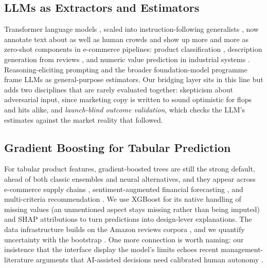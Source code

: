 \documentclass[journal]{IEEEtran}
\begin{document}
\subsection{LLMs as Extractors and Estimators}
Transformer language models \cite{vaswani2017attention,devlin2019bert}, scaled into instruction-following generalists \cite{brown2020gpt3,ouyang2022instruct,openai2023gpt4,gemini2023,touvron2023llama}, now annotate text about as well as human crowds \cite{gilardi2023chatgpt} and show up more and more as zero-shot components in e-commerce pipelines: product classification \cite{roumeliotis2025llms}, description generation from reviews \cite{gutierrez2025zeroshot}, and numeric value prediction in industrial systems \cite{hidayat2025custody}. Reasoning-eliciting prompting \cite{wei2022chain} and the broader foundation-model programme \cite{bommasani2021foundation} frame LLMs as general-purpose estimators. Our bridging layer sits in this line but adds two disciplines that are rarely evaluated together: skepticism about adversarial input, since marketing copy is written to sound optimistic for flops and hits alike, and \emph{launch-blind outcome validation}, which checks the LLM's estimates against the market reality that followed.

\subsection{Gradient Boosting for Tabular Prediction}
For tabular product features, gradient-boosted trees \cite{friedman2001greedy,chen2016xgboost,ke2017lightgbm} are still the strong default, ahead of both classic ensembles \cite{breiman2001random} and neural alternatives, and they appear across e-commerce supply chains \cite{sayyad2024catboost}, sentiment-augmented financial forecasting \cite{zhen2025stock,shang2025bitcoin}, and multi-criteria recommendation \cite{rakee2025temul}. We use XGBoost for its native handling of missing values (an unmentioned aspect stays missing rather than being imputed) and SHAP attributions \cite{lundberg2017shap} to turn predictions into design-lever explanations. The data infrastructure builds on the Amazon reviews corpora \cite{he2016ups,hou2024amazon}, and we quantify uncertainty with the bootstrap \cite{efron1979bootstrap}. One more connection is worth naming: our insistence that the interface display the model's limits echoes recent management-literature arguments that AI-assisted decisions need calibrated human autonomy \cite{cristofaro2026dancing}.
\end{document}
